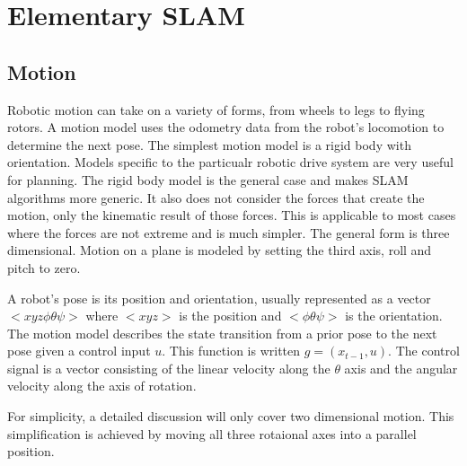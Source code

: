 \documentclass[12pt]{report}
\begin{document}
\chapter{Elementary SLAM}

\section{Motion}
Robotic motion can take on a variety of forms, from wheels to legs to
flying rotors. A motion model uses the odometry data from the robot's
locomotion to determine the next pose. The simplest motion model is a
rigid body with orientation. Models specific to the particualr robotic
drive system are very useful for planning. The rigid body model is the
general case and makes SLAM algorithms more generic. It also does not
consider the forces that create the motion, only the kinematic result
of those forces. This is applicable to most cases where the forces are
not extreme and is much simpler. The general form is three
dimensional. Motion on a plane is modeled by setting the third axis,
roll and pitch to zero.

A robot's pose is its position and orientation, usually represented as
a vector $<x y z \phi \theta \psi>$ where $<x y z>$ is the position
and $<\phi \theta \psi>$ is the orientation.  The motion model
describes the state transition from a prior pose to the next pose
given a control input $u$.  This function is written $g = (x_{t-1},
u)$. The control signal is a vector consisting of the linear velocity
along the $\theta$ axis and the angular velocity along the axis of rotation.

For simplicity, a detailed discussion will only cover two dimensional
motion.  This simplification is achieved by moving all three rotaional
axes into a parallel position.  
\end{document}
